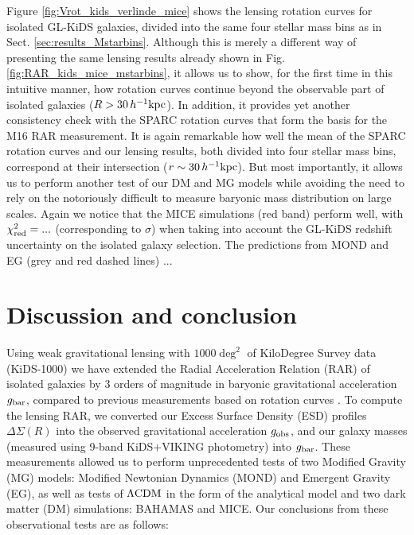 \documentclass[usenatbib]{mnras}
\newcommand{\hkpc}{\, h^{-1}{\rm{kpc}} }
\newcommand{\lcdm}{{\rm \Lambda CDM}}
\newcommand{\un}[1]{_{\rm #1}}
\begin{document}
Figure \ref{fig:Vrot_kids_verlinde_mice} shows the lensing rotation curves for isolated GL-KiDS galaxies, divided into the same four stellar mass bins as in Sect. \ref{sec:results_Mstarbins}. Although this is merely a different way of presenting the same lensing results already shown in Fig. \ref{fig:RAR_kids_mice_mstarbins}, it allows us to show, for the first time in this intuitive manner, how rotation curves continue beyond the observable part of isolated galaxies ($R>30\hkpc$). In addition, it provides yet another consistency check with the SPARC rotation curves \cite[]{lelli2016b} that form the basis for the M16 RAR measurement. It is again remarkable how well the mean of the SPARC rotation curves and our lensing results, both divided into four stellar mass bins, correspond at their intersection ($r\sim 30 \hkpc$). But most importantly, it allows us to perform another test of our DM and MG models while avoiding the need to rely on the notoriously difficult to measure baryonic mass distribution on large scales. Again we notice that the MICE simulations (red band) perform well, with $\chi\un{red}^2 = ...$ (corresponding to $\sigma$) when taking into account the GL-KiDS redshift uncertainty on the isolated galaxy selection. The predictions from MOND and EG (grey and red dashed lines) ...

\section{Discussion and conclusion}
\label{sec:discon}

Using weak gravitational lensing with $1000 \deg^2$ of KiloDegree Survey data (KiDS-1000) we have extended the Radial Acceleration Relation (RAR) of isolated galaxies by $3$ orders of magnitude in baryonic gravitational acceleration $g\un{bar}$, compared to previous measurements based on rotation curves \cite[most notably][M16]{mcgaugh2016}. To compute the lensing RAR, we converted our Excess Surface Density (ESD) profiles $\Delta\Sigma(R)$ into the observed gravitational acceleration $g\un{obs}$, and our galaxy masses (measured using 9-band KiDS+VIKING photometry) into $g\un{bar}$. These measurements allowed us to perform unprecedented tests of two Modified Gravity (MG) models: Modified Newtonian Dynamics (MOND) and Emergent Gravity (EG), as well as tests of $\lcdm$ in the form of the \cite[][N17]{navarro2017} analytical model and two dark matter (DM) simulations: BAHAMAS and MICE. Our conclusions from these observational tests are as follows:
\end{document}

